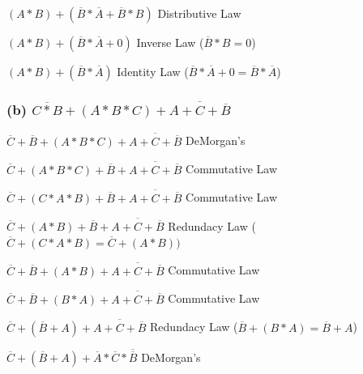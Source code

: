 \documentclass{article}
\newcommand{\boxedanswer}[1]{%

    \fbox{\large\textbf{#1}}%
}
\begin{document}
    $(A * B) + (\overline{B}*\overline{A} + \overline{B} * B)$ \hspace*{0.1in} Distributive Law

    $(A * B) + (\overline{B}*\overline{A} + 0)$ \hspace*{0.1in} Inverse Law ($\overline{B} * B = 0$)

    $(A * B) + (\overline{B}*\overline{A})$ \hspace*{0.1in} Identity Law ($\overline{B}*\overline{A} + 0 = \overline{B}*\overline{A}$)

    \vspace*{0.1in}

    \boxedanswer{$A * B + \overline{B}*\overline{A}$}

    \subsubsection*{(b) $\overline{C * B} + (A * B * C) + \overline{A + C + \overline{B}}$}

    $\overline{C} + \overline{B} + (A * B * C) + \overline{A + C + \overline{B}}$ \hspace*{0.1in} DeMorgan's

    $\overline{C} + (A * B * C) + \overline{B} + \overline{A + C + \overline{B}}$ \hspace*{0.1in} Commutative Law

    $\overline{C} + (C * A * B) + \overline{B} + \overline{A + C + \overline{B}}$ \hspace*{0.1in} Commutative Law

    $\overline{C} + ( A * B) + \overline{B} + \overline{A + C + \overline{B}}$ \hspace*{0.1in} Redundacy Law ($\overline{C} + (C * A * B) = \overline{C} + (A * B))$

    $\overline{C} + \overline{B} + ( A * B) + \overline{A + C + \overline{B}}$ \hspace*{0.1in} Commutative Law

    $\overline{C} + \overline{B} + (B * A) + \overline{A + C + \overline{B}}$ \hspace*{0.1in} Commutative Law
    
    $\overline{C} + (\overline{B} + A) + \overline{A + C + \overline{B}}$ \hspace*{0.1in} Redundacy Law ($\overline{B} + (B*A) = \overline{B} + A$)

    $\overline{C} + (\overline{B} + A) + \overline{A} * \overline{C} * \overline{\overline{B}}$ \hspace*{0.1in} DeMorgan's
\end{document}
